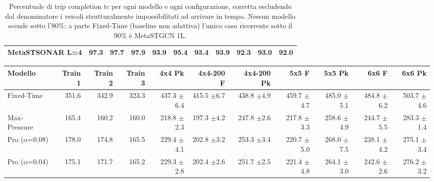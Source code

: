 \begin{table}
\begin{tabular}{@{}lrrrrrrrrrr@{}}
    MetaSTSONAR L=4           & 97.3    & 97.7    & 97.9    & 93.9   & 95.4      & 93.4       & 93.9  & 92.3   & 93.0  & 92.0   \\
    \bottomrule
  \end{tabular}
  \caption{Percentuale di trip completion $tc$ per ogni modello
    e ogni configurazione, corretta escludendo dal
    denominatore i veicoli strutturalmente impossibilitati ad arrivare in
    tempo. Nessun modello scende sotto l'80\%; a parte Fixed-Time (baseline non
    adattiva) l'unico caso ricorrente sotto il 90\% è MetaSTGCN 1L.}
  \label{tab:tc-adjusted}
\end{table}

\begin{table}
  \centering
  \tiny
  \begin{tabular}{@{}lrrrrrrrrrr@{}}
    \toprule
    Modello                   & Train 1 & Train 2 & Train 3 & 4x4 Pk                                     & 4x4-200 F                                   & 4x4-200 Pk                                 & 5x5 F                                       & 5x5 Pk                                     & 6x6 F                                       & 6x6 Pk                                      \\
    \midrule
    Fixed-Time                & 351.6   & 342.9   & 323.3   & 437.3 {\fontsize{4}{4}\selectfont$\pm$6.4} & 415.5 {\fontsize{4}{4}\selectfont$\pm$6.7}  & 438.8 {\fontsize{4}{4}\selectfont$\pm$4.9} & 459.7 {\fontsize{4}{4}\selectfont$\pm$4.7}  & 485.0 {\fontsize{4}{4}\selectfont$\pm$5.1} & 484.8 {\fontsize{4}{4}\selectfont$\pm$6.2}  & 503.7 {\fontsize{4}{4}\selectfont$\pm$4.6}  \\
    Max-Pressure              & 165.4   & 160.2   & 160.0   & 218.8 {\fontsize{4}{4}\selectfont$\pm$2.3} & 197.3 {\fontsize{4}{4}\selectfont$\pm$4.2}  & 247.8 {\fontsize{4}{4}\selectfont$\pm$2.6} & 217.8 {\fontsize{4}{4}\selectfont$\pm$3.3}  & 258.6 {\fontsize{4}{4}\selectfont$\pm$4.9} & 244.7 {\fontsize{4}{4}\selectfont$\pm$5.5}  & 283.3 {\fontsize{4}{4}\selectfont$\pm$1.4}  \\
    Pro ($\alpha$=0.08)       & 178.0   & 174.8   & 165.5   & 229.4 {\fontsize{4}{4}\selectfont$\pm$4.1} & 202.8 {\fontsize{4}{4}\selectfont$\pm$3.2}  & 253.3 {\fontsize{4}{4}\selectfont$\pm$3.4} & 220.7 {\fontsize{4}{4}\selectfont$\pm$5.0}  & 268.0 {\fontsize{4}{4}\selectfont$\pm$7.5} & 238.1 {\fontsize{4}{4}\selectfont$\pm$4.2}  & 275.1 {\fontsize{4}{4}\selectfont$\pm$3.4}  \\
    Pro ($\alpha$=0.04)       & 175.1   & 171.7   & 165.2   & 229.3 {\fontsize{4}{4}\selectfont$\pm$2.8} & 202.4 {\fontsize{4}{4}\selectfont$\pm$2.6}  & 251.7 {\fontsize{4}{4}\selectfont$\pm$2.5} & 221.4 {\fontsize{4}{4}\selectfont$\pm$4.8}  & 264.1 {\fontsize{4}{4}\selectfont$\pm$3.0} & 242.6 {\fontsize{4}{4}\selectfont$\pm$2.6}  & 276.2 {\fontsize{4}{4}\selectfont$\pm$3.2}  \\

\end{tabular}
\end{table}
